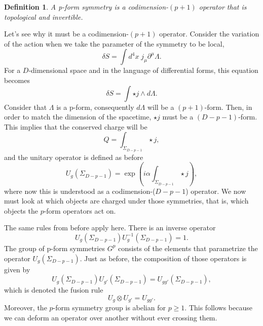 \documentclass{article}
\newtheorem{definition}{Definition}
\begin{document}
\begin{definition}
	A p-form symmetry is a codimension-$(p+1)$ operator that is topological and invertible. 
\end{definition}
Let’s see why it must be a codimension-$(p+1)$ operator. Consider the variation of the action when we take the parameter of the symmetry to be local,
\begin{equation}
	\delta S=\int d^4x\;j_\mu\partial^\mu\Lambda.
\end{equation}
For a $D$-dimensional space and in the language of differential forms, this equation becomes 
\begin{equation}
	\delta S=\int\star j\wedge d\Lambda.
\end{equation}
Consider that $\Lambda$  is a p-form, consequently $d\Lambda$ will be a $(p+1)$-form. Then, in order to match the dimension of the spacetime, $\star j$ must be a $(D-p-1)$-form. This implies that the conserved charge will be 
\begin{equation}
	Q=\int_{\Sigma_{D-p-1}} \star j,
\end{equation}
and the unitary operator is defined as before
\begin{equation}
	U_g(\Sigma_{D-p-1})=\exp\left(i\alpha\int_{\Sigma_{D-p-1}}\star j\right),
\end{equation}
where now this is understood as a codimension-($D-p-1$) operator.
We now must look at which objects are charged under those symmetries, that is, which objects the $p$-form operators act on.

The same rules from before apply here. There is an inverse operator
\begin{equation}
	U_g(\Sigma_{D-p-1})U_g^{-1}(\Sigma_{D-p-1})=1.
\end{equation}
The group of p-form symmetries $G^{p}$  consists of the elements that parametrize the operator $U_g(\Sigma_{D-p-1}).$ Just as before, the composition of those operators is given by  
\begin{equation}
	U_g(\Sigma_{D-p-1})U_{g'}(\Sigma_{D-p-1})=U_{gg'}(\Sigma_{D-p-1}),
\end{equation}
which is denoted the fusion rule 
\begin{equation}
	U_g\otimes U_{g'}=U_{gg'}.
\end{equation}
Moreover, the $p$-form symmetry group is abelian for $p\ge 1.$ This follows because we can deform an operator over another without ever crossing them. 
\end{document}
